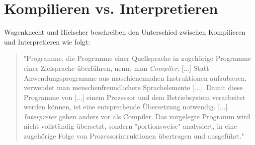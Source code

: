 \section{Kompilieren vs. Interpretieren}
\label{sec:basics:compile-interpret}

Wagenknecht und Hielscher beschreiben den Unterschied zwischen Kompilieren und Interpretieren wie folgt:

\begin{quote}
    "Programme, die Programme einer Quellsprache in zugehörige Programme einer Zielsprache überführen, nennt man \emph{Compiler}. [...] Statt Anwendungsprogramme aus maschienennahen Instruktionen aufzubauen, verwendet man menschenfreundlichere Sprachelemente [...]. Damit diese Programme von [...] einem Prozessor und dem Betriebsystem verarbeitet werden können, ist eine entsprechende Übersetzung notwendig. [...] \emph{Interpreter} gehen anders vor als Compiler. Das vorgelegte Programm wird nicht vollständig übersetzt, sondern "portionsweise" analysiert, in eine zugehörige Folge von Prozessorintruktionen übertragen und ausgeführt."~\cite[47]{wagenknecht2009}
\end{quote}
